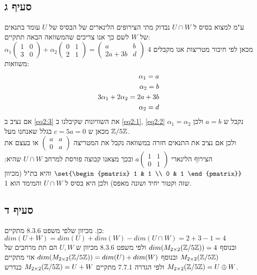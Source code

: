 \documentclass{article}
\DeclarePairedDelimiter\set\{\}
\begin{document}
	\subsection*{סעיף ג}
	ע"מ למצוא בסיס ל $U \cap W$ נבדוק מתי הצירופים הלינארים של הבסיס של $U$ עומד בתנאים של $W$
	לשם כך אנו צריכים שהמשוואה הבאה תתקיים: \\
	$\alpha_1 \begin{pmatrix}
		1 & 0 \\
		3 & 0
	\end{pmatrix} + \alpha_2 \begin{pmatrix}
		0 & 1 \\
		2 & 1
	\end{pmatrix} =
	\begin{pmatrix}
		a & b \\
		2a + 3b & d
	\end{pmatrix}$
	מכאן לפי חיבור מטריצות אנו מקבלים 4 משוואות:
	\begin{align} \setcounter{equation}{0}
		\alpha_1 = a \label{eq2:1}\\
		\alpha_2 = b \label{eq2:2}\\
		3\alpha_1 + 2\alpha_2 = 2a + 3b \label{eq2:3}\\
		\alpha_2 = d
	\end{align}
	אם נציב ב \ref{eq2:3} את השוויונות שקיבלנו ב \ref{eq2:1}, \ref{eq2:2} נקבל ש $a=b$ ולכן $\alpha_1= \alpha_2$ מכאן ש $c=5a=0$ בגלל שאנחנו מעל $\mathbb{Z}/5\mathbb{Z}$. \\
	ולכן אם נציב את התנאים חזרה במשוואה נקבל את המטריצה $\begin{pmatrix}
		a & a \\
		0 & a
	\end{pmatrix}$ או בעצם את הצירוף הלינארי $a \begin{pmatrix}
		1 & 1 \\
		0 & 1
	\end{pmatrix}$ ובכך מצאנו קבוצה פורסת למרחב $U \cap W$ שהיא: $\set{\begin{pmatrix}
		1 & 1 \\
		0 & 1
	\end{pmatrix}}$ והיא בת"ל (מכיוון שזה וקטור יחיד ושונה מאפס) ולכן היא בסיס ל $U \cap W$ והמימד הוא 1.

	\subsection*{סעיף ד}
	כן. מכיוון שלפי משפט 8.3.6 מתקיים: \\
	$dim(U + W) = dim(U) + dim(W) - dim(U \cap W) = 2+3-1=4$ \\
	ובנוסף $dim(M_{2\times2}(\mathbb{Z}/5\mathbb{Z}))=4$ ולפי משפט 8.3.6 מכיוון ש $U,W$ הם תת מרחבים של $M_{2\times2}(\mathbb{Z}/5\mathbb{Z})$
	ובנוסף $dim(M_{2\times2}(\mathbb{Z}/5\mathbb{Z})) = dim(U) + dim(W)$ אזי מתקיים $M_{2\times2}(\mathbb{Z}/5\mathbb{Z}) = U \oplus W$ ולפי הגדרה 7.7.1 מתקיים $M_{2\times2}(\mathbb{Z}/5\mathbb{Z}) = U+W$ כנדרש.
\end{document}
